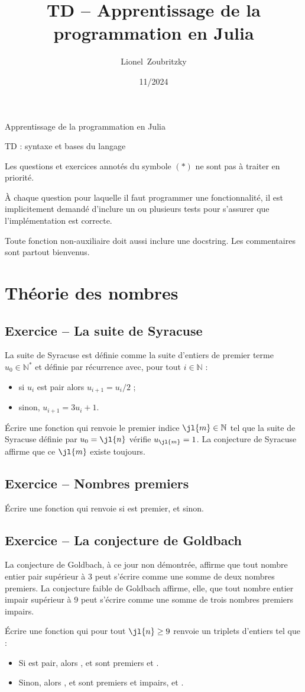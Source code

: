 \documentclass{article}
\title{TD -- Apprentissage de la programmation en Julia}
\author{Lionel~Zoubritzky}
\date{11/2024}
\newcounter{loop}
\newcounter{numEx}
\newcommand{\exo}[1]{
	\stepcounter{numEx}
	\setcounter{loop}{0}
	\subsection*{Exercice \arabic{numEx} -- #1}
}
\newcommand{\N}{\mathbb{N}}
\begin{document}
	
\begin{center}
	\Large Apprentissage de la programmation en Julia
	
	TD  : syntaxe et bases du langage
	\vspace{2em}
\end{center}

Les questions et exercices annotés du symbole $(*)$ ne sont pas à traiter en priorité.

À chaque question pour laquelle il faut programmer une fonctionnalité, il est implicitement demandé d'inclure un ou plusieurs tests pour s'assurer que l'implémentation est correcte.

Toute fonction non-auxiliaire doit aussi inclure une docstring. Les commentaires sont partout bienvenus.


\section{Théorie des nombres}

\exo{La suite de Syracuse}

La suite de Syracuse est définie comme la suite d'entiers de premier terme $u_0\in\N^*$ et définie par récurrence avec, pour tout $i\in\N$ :
\begin{itemize}
	\item si $u_i$ est pair alors $u_{i+1} = u_i/2$ ;
	\item sinon, $u_{i+1} = 3u_i + 1$.
\end{itemize}

Écrire une fonction  qui renvoie le premier indice $\jl{m}\in\N$ tel que la suite de Syracuse définie par $u_0 = \jl{n}$ vérifie $u_{\jl{m}} = 1$. La conjecture de Syracuse affirme que ce $\jl{m}$ existe toujours.

\exo{Nombres premiers}

Écrire une fonction  qui renvoie  si  est premier, et  sinon.

\exo{La conjecture de Goldbach}

La conjecture de Goldbach, à ce jour non démontrée, affirme que tout nombre entier pair supérieur à 3 peut s’écrire comme une somme de deux nombres premiers. La conjecture faible de Goldbach affirme, elle, que tout nombre entier impair supérieur à 9 peut s'écrire comme une somme de trois nombres premiers impairs.

Écrire une fonction  qui pour tout $\jl{n} \ge 9$ renvoie un triplets d'entiers  tel que :
\begin{itemize}
	\item Si  est pair, alors ,  et  sont premiers et .
	\item Sinon, alors ,  et  sont premiers et impairs, et .
\end{itemize}
\end{document}
